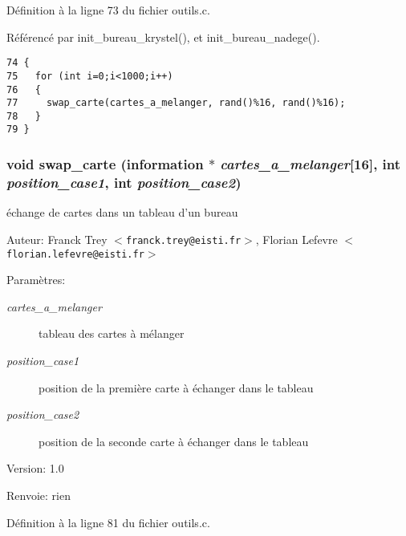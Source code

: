 D\'{e}finition \`{a} la ligne 73 du fichier outils.c.

R\'{e}f\'{e}renc\'{e} par init\_\-bureau\_\-krystel(), et init\_\-bureau\_\-nadege().

\begin{Code}\begin{verbatim}74 {
75   for (int i=0;i<1000;i++)
76   {
77     swap_carte(cartes_a_melanger, rand()%16, rand()%16);
78   }
79 }
\end{verbatim}\end{Code}


\subsubsection{\setlength{\rightskip}{0pt plus 5cm}void swap\_\-carte ({\bf information} $\ast$ {\em cartes\_\-a\_\-melanger}[16], int {\em position\_\-case1}, int {\em position\_\-case2})}\label{outils_8c_449869c420d1199183139e03451f2adf}


\'{e}change de cartes dans un tableau d'un bureau 

\begin{Desc}
\item[Auteur:]Franck Trey $<${\tt franck.trey@eisti.fr}$>$, Florian Lefevre $<${\tt florian.lefevre@eisti.fr}$>$\end{Desc}
\begin{Desc}
\item[Param\`{e}tres:]
\begin{description}
\item[{\em cartes\_\-a\_\-melanger}]tableau des cartes \`{a} m\'{e}langer \item[{\em position\_\-case1}]position de la premi\`{e}re carte \`{a} \'{e}changer dans le tableau \item[{\em position\_\-case2}]position de la seconde carte \`{a} \'{e}changer dans le tableau\end{description}
\end{Desc}
\begin{Desc}
\item[Version:]1.0 \end{Desc}
\begin{Desc}
\item[Renvoie:]rien \end{Desc}


D\'{e}finition \`{a} la ligne 81 du fichier outils.c.

